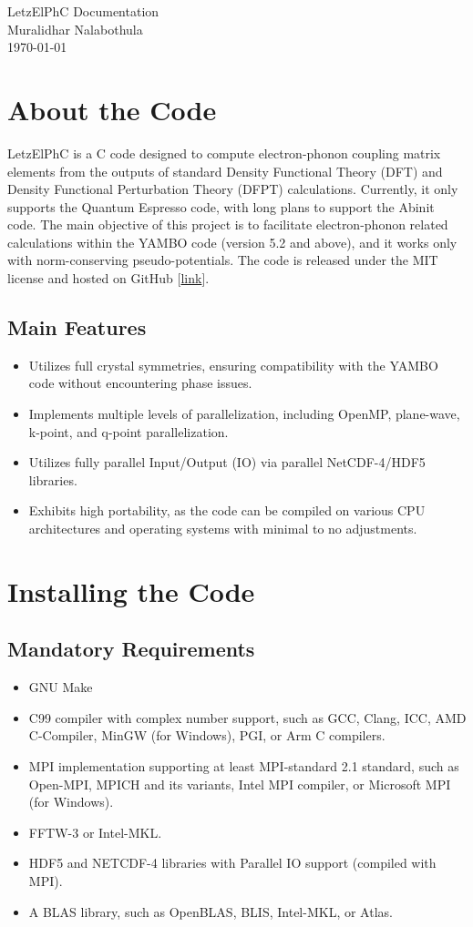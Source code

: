 \documentclass[12pt,twoside,openany]{book}
\renewcommand{\sectionmark}[1]{\markright{\thesection\ #1}}
\newcommand{\prefrontmatter}{\thispagestyle{empty}
   \begin{center}
        \huge\projecttitle\\
        \vspace{10pt}
        \large{\projectauthor}\\
        \vspace{10pt}
        \small{\projectmonth}\\
   \end{center}
    \clearpage
   \thispagestyle{empty}
}
\def\projectauthor{Muralidhar Nalabothula}
\def\projecttitle{LetzElPhC Documentation}
\def\projectmonth{\today}
\begin{document}
\prefrontmatter
{}
\renewcommand{\sectionmark}[1]{\markright{#1}}
\addtolength{\parskip}{-\baselineskip}  
\tableofcontents
\addtolength{\parskip}{\baselineskip}
\renewcommand{\sectionmark}[1]{\markright{\thesection\ #1}}
\clearpage
%
%
%
%
%
%
%
%
%
%
%
\chapter{About the Code}
LetzElPhC is a C code designed to compute electron-phonon coupling matrix elements from the outputs of standard Density Functional Theory (DFT) and Density Functional Perturbation Theory (DFPT) calculations. 
Currently, it only supports the Quantum Espresso code, with long plans to support the Abinit code. 
The main objective of this project is to facilitate electron-phonon related calculations 
within the YAMBO code (version 5.2 and above), and it works only with norm-conserving pseudo-potentials. 
The code is released under the MIT license and hosted on GitHub [\href{https://github.com/muralidhar-nalabothula/LetzElPhC}{link}].
\section{Main Features}
\begin{itemize}
\item Utilizes full crystal symmetries, ensuring compatibility with the YAMBO code without encountering phase issues.
\item Implements multiple levels of parallelization, including OpenMP, plane-wave, k-point, and q-point parallelization.
\item Utilizes fully parallel Input/Output (IO) via parallel NetCDF-4/HDF5 libraries.
\item Exhibits high portability, as the code can be compiled on various CPU architectures and operating systems with minimal to no adjustments.
\end{itemize}
\chapter{Installing the Code}
\section{Mandatory Requirements}
\begin{itemize}
\item GNU Make
\item C99 compiler with complex number support, such as GCC, Clang, ICC, AMD C-Compiler, MinGW (for Windows), PGI, or Arm C compilers.
\item MPI implementation supporting at least MPI-standard 2.1 standard, such as Open-MPI, MPICH and its variants, Intel MPI compiler, or Microsoft MPI (for Windows).
\item FFTW-3 or Intel-MKL.
\item HDF5 and NETCDF-4 libraries with Parallel IO support (compiled with MPI).
\item A BLAS library, such as OpenBLAS, BLIS, Intel-MKL, or Atlas.
\end{itemize}
\end{document}
